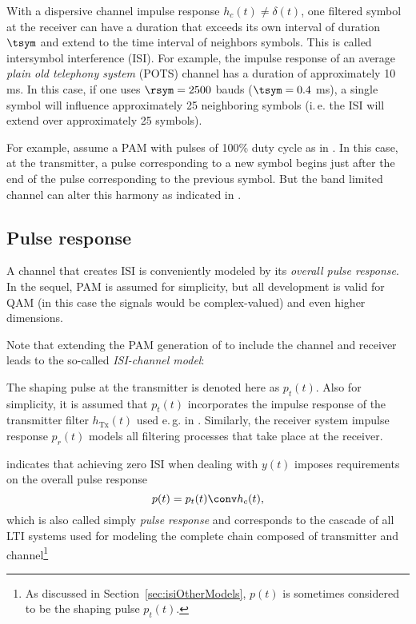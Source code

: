 With a dispersive channel impulse response $h_c(t) \ne \delta(t)$, one filtered symbol at the receiver can have a duration that exceeds its own interval of duration $\tsym$ and extend to the time interval of neighbors symbols. This is called intersymbol interference (ISI). For example, the impulse response of an average \emph{plain old telephony system} (POTS) channel has a duration of approximately 10 ms. In this case, if one uses $\rsym=2500$ bauds ($\tsym=0.4$ ms), a single symbol will influence approximately 25 neighboring symbols (i.\,e. the ISI will extend over approximately 25 symbols).

For example, assume a PAM with pulses of 100\% duty cycle as in . In this case, at the transmitter, a pulse corresponding to a new symbol begins just after the end of the pulse corresponding to the previous symbol. But the band limited channel can alter this harmony as indicated in .

\subsection{Pulse response}

A channel that creates ISI is conveniently modeled by its \emph{overall pulse response}.
In the sequel, PAM is assumed for simplicity, but all development is valid for QAM (in this case the
signals would be complex-valued) and even higher dimensions. 

Note that extending the PAM generation of  to include the channel and receiver leads to the so-called \emph{ISI-channel model}:


The shaping pulse at the transmitter is denoted here as $p_t(t)$. Also for simplicity, it is
assumed that $p_t(t)$ incorporates the impulse response of the transmitter filter $h_{\textrm{Tx}}(t)$ used e.\,g. in . Similarly, the receiver system impulse response $p_r(t)$ models all filtering processes that take place at the receiver. 

 indicates that achieving zero ISI when dealing with $y(t)$ imposes requirements on the overall pulse response
\begin{equation}
p(t) = p_t(t) \conv h_c(t),
\label{eq:overallPulse}
\end{equation}
which is also called simply \emph{pulse response} and corresponds to the cascade of all LTI systems used for modeling the complete chain composed of transmitter and channel\footnote{As discussed in Section~\ref{sec:isiOtherModels}, $p(t)$ is sometimes considered to be the shaping pulse $p_t(t)$.}

